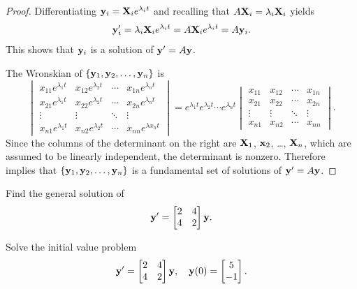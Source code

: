 \begin{proof}
Differentiating $\mathbf{y}_i=\mathbf{X}_ie^{\lambda_it}$ and recalling
that $A\mathbf{X}_i=\lambda_i\mathbf{X}_i$ yields
\[
\mathbf{y}_i'=\lambda_i\mathbf{X}_ie^{\lambda_it}=A\mathbf{X}_ie^{\lambda_it}
=A\mathbf{y}_i.
\]
This shows that $\mathbf{y}_i$ is a solution of $\mathbf{y}'=A\mathbf{y}$.

The Wronskian of
 $\{\mathbf{y}_1,\mathbf{y}_2,\ldots,\mathbf{y}_n\}$ is
\[
\begin{vmatrix}
x_{11}e^{\lambda_1 t}& x_{12}e^{\lambda_2 t}&\cdots& x_{1n}e^{\lambda_n t}\\
x_{21}e^{\lambda_1 t}& x_{22}e^{\lambda_2 t}&\cdots& x_{2n}e^{\lambda_n t}\\
\vdots&\vdots&\ddots&\vdots\\
x_{n1}e^{\lambda_1 t}& x_{n2}e^{\lambda_2 t}&\cdots& x_{nn}e^{\lambda x_n t}
\end{vmatrix}
=e^{\lambda_1 t}e^{\lambda_2 t}\cdots e^{\lambda_n t}
\begin{vmatrix}
x_{11}&x_{12}&\cdots&x_{1n}\\
x_{21}&x_{22}&\cdots&x_{2n}\\
\vdots&\vdots&\ddots&\vdots\\
x_{n1}&x_{n2}&\cdots&x_{nn}
\end{vmatrix}.
\]
Since the columns of the determinant on the right are $\mathbf{X}_1$, $\mathbf{x}_2$, \dots, $\mathbf{X}_n$, which are assumed to be linearly independent,
the determinant is nonzero. Therefore
 implies that
$\{\mathbf{y}_1,\mathbf{y}_2,\ldots,\mathbf{y}_n\}$ is a fundamental set of
solutions of $\mathbf{y}'=A\mathbf{y}$.
\end{proof}

\begin{example}\label{example:10.4.1}
\begin{alist}
\item %
 Find the general solution of
\begin{equation}\label{eq:10.4.8}
\mathbf{y}'=\begin{bmatrix}2&4\\4&2\end{bmatrix}
\mathbf{y}.
\end{equation}

\item %
 Solve the initial value problem
\begin{equation}\label{eq:10.4.9}
\mathbf{y}'=\begin{bmatrix}2&4\\4&2\end{bmatrix}
\mathbf{y},\quad\mathbf{y}(0)=\begin{bmatrix}5 \\-1\end{bmatrix}.
\end{equation}
\end{alist}
\end{example}

